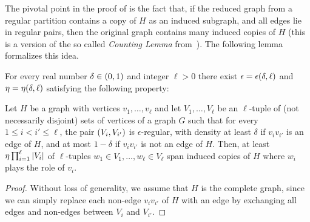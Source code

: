         The pivotal point in the proof of  is the fact that, if the
        reduced graph from a regular partition contains a copy of $H$ as an induced subgraph, and all edges
        lie in regular pairs, then the original graph contains many induced copies of $H$
        (this is a version of the so called \emph{Counting Lemma}
        from~\cite{the_regulariy_lemma_and_its_applications_in_graph_theory}).
        The following lemma formalizes this idea.

        \begin{lemma} \label{lem:H_like_partition_implies_H_abundance}
            For every real number $\delta \in ( 0, 1 )$ and integer $\ell > 0$ there exist $\epsilon = \epsilon ( \delta, \ell )$ and
            $\eta = \eta ( \delta, \ell )$ satisfying the following property:

            Let $H$ be a graph with vertices $v_1, \dots,v_\ell$ and let $V_1, \dots, V_\ell$ be an $\ell$-tuple of (not necessarily disjoint)
            sets of vertices of a graph $G$ such that for every $1 \leq i < i' \leq \ell$, the pair $( V_i, V_{i'} )$
            is $\epsilon$-regular, with density at least $\delta$ if $v_i v_{i'}$ is an edge of $H$, and at most $1 - \delta$
            if $v_i v_{i'}$ is not an edge of $H$.
            Then, at least $\eta \prod_{i=1}^\ell | V_i |$ of $\ell$-tuples $w_1 \in V_1, \dots, w_\ell \in V_\ell$
            span induced copies of $H$ where $w_i$ plays the role of $v_i$.
            \begin{proof}
                Without loss of generality, we assume that $H$ is the complete graph, since we can simply replace each non-edge
                $v_i v_{i'}$ of $H$ with an edge by exchanging all edges and non-edges between $V_i$ and $V_{i'}$.


\end{proof}
\end{lemma}
